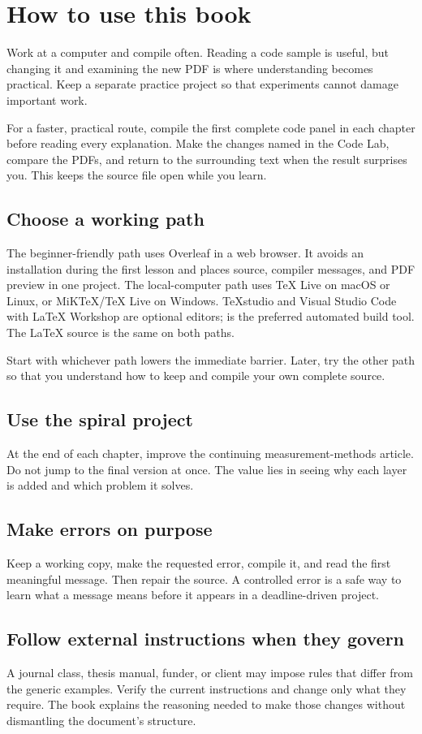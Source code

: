 \chapter*{How to use this book}

Work at a computer and compile often. Reading a code sample is useful, but
changing it and examining the new PDF is where understanding becomes
practical. Keep a separate practice project so that experiments cannot damage
important work.

For a faster, practical route, compile the first complete code panel in each
chapter before reading every explanation. Make the changes named in the Code
Lab, compare the PDFs, and return to the surrounding text when the result
surprises you. This keeps the source file open while you learn.

\section*{Choose a working path}

The beginner-friendly path uses Overleaf in a web browser. It avoids an
installation during the first lesson and places source, compiler messages,
and PDF preview in one project. The local-computer path uses TeX Live on macOS
or Linux, or MiKTeX/TeX Live on Windows. TeXstudio and Visual Studio Code with
\LaTeX{} Workshop are optional editors;  is the preferred automated
build tool. The \LaTeX{} source is the same on both paths.

Start with whichever path lowers the immediate barrier. Later, try the other
path so that you understand how to keep and compile your own complete source.

\section*{Use the spiral project}

At the end of each chapter, improve the continuing measurement-methods
article. Do not jump to the final version at once. The value lies in seeing
why each layer is added and which problem it solves.

\section*{Make errors on purpose}

Keep a working copy, make the requested error, compile it, and read the first
meaningful message. Then repair the source. A controlled error is a safe way
to learn what a message means before it appears in a deadline-driven project.

\section*{Follow external instructions when they govern}

A journal class, thesis manual, funder, or client may impose rules that differ
from the generic examples. Verify the current instructions and change only
what they require. The book explains the reasoning needed to make those
changes without dismantling the document's structure.
